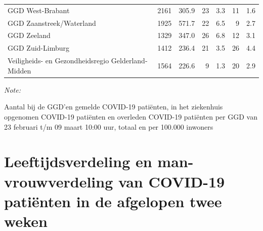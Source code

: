 \documentclass[
  english,
  man,floatsintext]{apa6}
\begin{document}
\begin{table}
\begin{threeparttable}
\begin{tabular}{lrrrrrr}
GGD West-Brabant & 2161 & 305.9 & 23 & 3.3 & 11 & 1.6\\
GGD Zaanstreek/Waterland & 1925 & 571.7 & 22 & 6.5 & 9 & 2.7\\
GGD Zeeland & 1329 & 347.0 & 26 & 6.8 & 12 & 3.1\\
GGD Zuid-Limburg & 1412 & 236.4 & 21 & 3.5 & 26 & 4.4\\
Veiligheids- en Gezondheidsregio Gelderland-Midden & 1564 & 226.6 & 9 & 1.3 & 20 & 2.9\\
\bottomrule
\end{tabular}
\begin{tablenotes}
\item \textit{Note: } 
\item Aantal bij de GGD’en gemelde COVID-19 patiënten, in het ziekenhuis opgenomen COVID-19 patiënten en overleden COVID-19 patiënten per GGD van 23 februari t/m 09 maart 10:00 uur, totaal en per 100.000 inwoners
\end{tablenotes}
\end{threeparttable}
\endgroup{}
\end{table}

\newpage

\hypertarget{leeftijdsverdeling-en-man-vrouwverdeling-van-covid-19-patiuxebnten-in-de-afgelopen-twee-weken}{%
\section{Leeftijdsverdeling en man-vrouwverdeling van COVID-19 patiënten in de afgelopen twee weken}\label{leeftijdsverdeling-en-man-vrouwverdeling-van-covid-19-patiuxebnten-in-de-afgelopen-twee-weken}}
\end{document}
